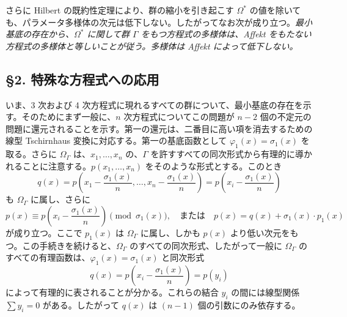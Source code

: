 さらに Hilbert の既約性定理により、群の縮小を引き起こす $\Omega^*$ の値を除いても、パラメータ多様体の次元は低下しない。したがってなお次が成り立つ。\emph{最小基底の存在から、$\Omega^*$ に関して群 $\Gamma$ をもつ方程式の多様体は、Affekt をもたない方程式の多様体と等しいことが従う。多様体は Affekt によって低下しない。}

\subsection*{\S 2. 特殊な方程式への応用}

いま、3 次および 4 次方程式に現れるすべての群について、最小基底の存在を示す。そのためにまず一般に、$n$ 次方程式についてこの問題が $n-2$ 個の不定元の問題に還元されることを示す。第一の還元は、二番目に高い項を消去するための線型 Tschirnhaus 変換に対応する。第一の基底函数として $\varphi_1(x)=\sigma_1(x)$ を取る。さらに $\Omega_\Gamma$ は、$x_1,
\ldots,x_n$ の、$\Gamma$ を許すすべての同次形式から有理的に導かれることに注意する。$p(x_1,
\ldots,x_n)$ をそのような形式とする。このとき
\[
q(x)=p\left(x_1-\frac{\sigma_1(x)}{n},\ldots,x_n-\frac{\sigma_1(x)}{n}\right)=p\left(x_i-\frac{\sigma_1(x)}{n}\right)
\]
も $\Omega_\Gamma$ に属し、さらに
\[
p(x)\equiv p\left(x_i-\frac{\sigma_1(x)}{n}\right)\pmod{\sigma_1(x)},
\quad\text{または}\quad
p(x)=q(x)+\sigma_1(x)\cdot p_1(x)
\]
が成り立つ。ここで $p_1(x)$ は $\Omega_\Gamma$ に属し、しかも $p(x)$ より低い次元をもつ。この手続きを続けると、$\Omega_\Gamma$ のすべての同次形式、したがって一般に $\Omega_\Gamma$ のすべての有理函数は、$\varphi_1(x)=\sigma_1(x)$ と同次形式
\[
q(x)=p\left(x_i-\frac{\sigma_1(x)}{n}\right)=p(y_i)
\]
によって有理的に表されることが分かる。これらの結合 $y_i$ の間には線型関係 $\sum y_i=0$ がある。したがって $q(x)$ は $(n-1)$ 個の引数にのみ依存する。

